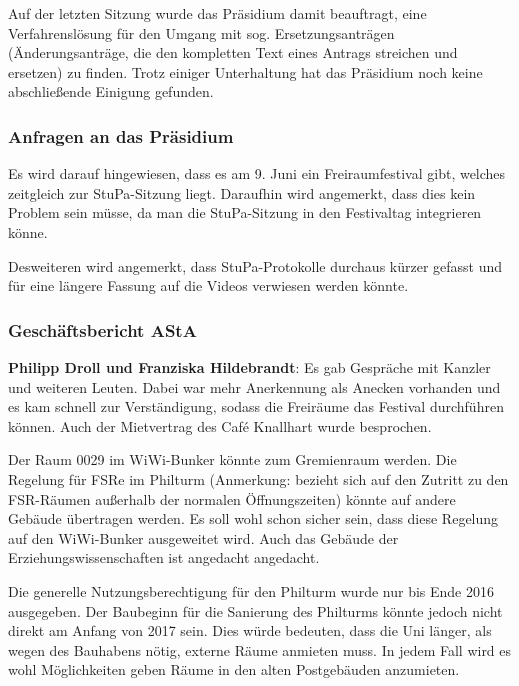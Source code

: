\documentclass[ngerman,headheight=70pt]{scrartcl}
\begin{document}
    Auf der letzten Sitzung wurde das Präsidium damit beauftragt, eine Verfahrenslösung
    für den Umgang mit sog. Ersetzungsanträgen (Änderungsanträge, die den kompletten
    Text eines Antrags streichen und ersetzen) zu finden. Trotz einiger Unterhaltung
    hat das Präsidium noch keine abschließende Einigung gefunden.

    \subsubsection{Anfragen an das Präsidium}

    Es wird darauf hingewiesen, dass es am 9. Juni ein Freiraumfestival gibt,
    welches zeitgleich zur StuPa-Sitzung liegt. Daraufhin wird angemerkt,
    dass dies kein Problem sein müsse, da man die StuPa-Sitzung in den
    Festivaltag integrieren könne.

    Desweiteren wird angemerkt, dass StuPa-Protokolle durchaus kürzer gefasst
    und für eine längere Fassung auf die Videos verwiesen werden könnte.

    \subsubsection{Geschäftsbericht AStA}

    \textbf{Philipp Droll und Franziska Hildebrandt}: Es gab Gespräche mit
    Kanzler und weiteren Leuten. Dabei war mehr Anerkennung als Anecken vorhanden
    und es kam schnell zur Verständigung, sodass die Freiräume das Festival
    durchführen können. Auch der Mietvertrag des Café Knallhart wurde besprochen.

    Der Raum 0029 im WiWi-Bunker könnte zum Gremienraum werden. Die Regelung für
    FSRe im Philturm (Anmerkung: bezieht sich auf den Zutritt zu den FSR-Räumen
    außerhalb der normalen Öffnungszeiten) könnte auf andere Gebäude übertragen
    werden. Es soll wohl schon sicher sein, dass diese Regelung auf den WiWi-Bunker
    ausgeweitet wird. Auch das Gebäude der Erziehungswissenschaften ist
    angedacht angedacht.

    Die generelle Nutzungsberechtigung für den Philturm wurde nur bis Ende 2016
    ausgegeben. Der Baubeginn für die Sanierung des Philturms könnte jedoch nicht
    direkt am Anfang von 2017 sein. Dies würde bedeuten, dass die Uni länger, als
    wegen des Bauhabens nötig, externe Räume anmieten muss. In jedem Fall wird es
    wohl Möglichkeiten geben Räume in den alten Postgebäuden anzumieten.
\end{document}
